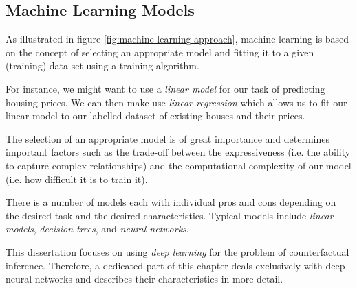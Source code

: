 \subsection{Machine Learning Models}
As illustrated in figure \ref{fig:machine-learning-approach}, machine learning is based on the concept of selecting an appropriate model and fitting it to a given (training) data set using a training algorithm. 

For instance, we might want to use a \emph{linear model} for our task of predicting housing prices. We can then make use \emph{linear regression} which allows us to fit our linear model to our labelled dataset of existing houses and their prices. 
 
The selection of an appropriate model is of great importance and determines important factors such as the trade-off between the expressiveness (i.e. the ability to capture complex relationships) and the computational complexity of our model (i.e. how difficult it is to train it). 

There is a number of models each with individual pros and cons depending on the desired task and the desired characteristics. Typical models include \emph{linear models}, \emph{decision trees}, and \emph{neural networks}. 

This dissertation focuses on using \emph{deep learning} for the problem of counterfactual inference. Therefore, a dedicated part of this chapter deals exclusively with deep neural networks and describes their characteristics in more detail. 



%
%
%

